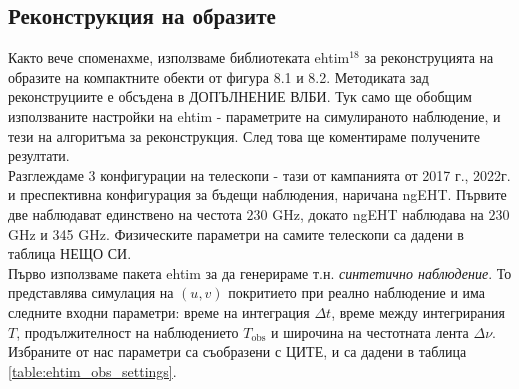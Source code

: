 \subsection{Реконструкция на образите}

Както вече споменахме, използваме библиотеката ehtim$^{18}$ за реконструцията на образите на компактните обекти от фигура 8.1 и 8.2. Методиката зад реконструциите е обсъдена в ДОПЪЛНЕНИЕ ВЛБИ. Тук само ще обобщим използваните настройки на ehtim - параметрите на симулираното наблюдение, и тези на алгоритъма за реконструкция. След това ще коментираме получените резултати.\\

Разглеждаме 3 конфигурации на телескопи - тази от кампанията от 2017 г., 2022г. и преспективна конфигурация за бъдещи наблюдения, наричана ngEHT. Първите две наблюдават единствено на честота $230$ GHz, докато ngEHT наблюдава на $230$ GHz и 345 GHz. Физическите параметри на самите телескопи са дадени в таблица НЕЩО СИ. \\

Първо използваме пакета ehtim за да генерираме т.н. \emph{синтетично наблюдение}. То представлява симулация на $(u,v)$ покритието при реално наблюдение и има следните входни параметри: време на интеграция $\Delta t$, време между интегрирания $T$, продължителност на наблюдението $T_\text{obs}$ и широчина на честотната лента $\Delta\nu$. Избраните от нас параметри са съобразени с ЦИТЕ, и са дадени в таблица \ref{table:ehtim_obs_settings}.\\

